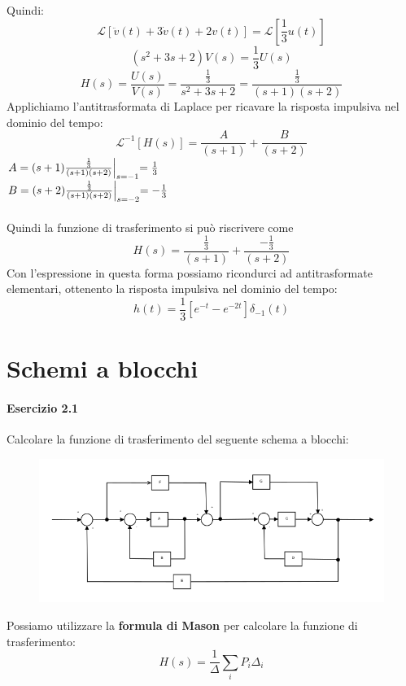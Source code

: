 \documentclass[12pt,a4paper]{article}
\begin{document}
\begin{enumerate}
		Quindi:
		\[
			\mathcal{L}[\ddot{v}(t) + 3\dot{v}(t) + 2v(t)] = \mathcal{L}[\frac{1}{3}u(t)]
		\]
		\[
			(s^2 + 3s + 2)V(s) = \frac{1}{3}U(s)
		\]
		\[
			H(s) = \frac{U(s)}{V(s)} = \frac{\frac{1}{3}}{s^2 + 3s + 2} = \frac{\frac{1}{3}}{(s+1)(s+2)}
		\]
		Applichiamo l'antitrasformata di Laplace per ricavare la risposta impulsiva nel dominio del tempo:
		\[
			\mathcal{L}^{-1}[H(s)] = \frac{A}{(s+1)} + \frac{B}{(s+2)} 
		\]
		$A = (s+1)\frac{\frac{1}{3}}{(s+1)(s+2)}\Bigl\lvert_{s = -1} = \frac{1}{3} $ 
		\vspace{5mm}
		\\
		$B = (s+2)\frac{\frac{1}{3}}{(s+1)(s+2)}\Bigl\lvert_{s = -2} = -\frac{1}{3} $\\ \\
		Quindi la funzione di trasferimento si può riscrivere come
		\[
			H(s) = \frac{\frac{1}{3}}{(s+1)} + \frac{-\frac{1}{3}}{(s+2)}
		\]
		Con l'espressione in questa forma possiamo ricondurci ad antitrasformate elementari, ottenento la risposta impulsiva nel dominio del tempo:
		\[
			h(t) =\frac{1}{3}[e^{-t} - e^{-2t}]\delta_{-1}(t)
		\]
	\end{enumerate}
	\newpage
	\section*{Schemi a blocchi}
	\paragraph*{Esercizio 2.1}
	Calcolare la funzione di trasferimento del seguente schema a blocchi:
	\begin{figure}[h!]
		\centering
		\includegraphics[scale=0.5]{./images/schema21.png}
	\end{figure}

	Possiamo utilizzare la \textbf{formula di Mason} per calcolare la funzione di trasferimento:
	\[
		H(s) = \frac{1}{\Delta}\sum_i P_i \Delta_i
	\]
\end{document}
